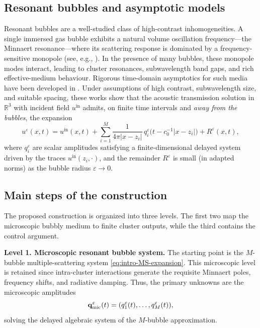 \documentclass[11pt,a4paper]{article}
\numberwithin{equation}{section}
\newcommand{\R}{\mathbb{R}}
\begin{document}
\subsection{Resonant bubbles and asymptotic models}
\noindent
Resonant bubbles are a well-studied class of high-contrast inhomogeneities. A single immersed gas bubble exhibits a natural volume oscillation frequency---the Minnaert resonance---where its scattering response is dominated by a frequency-sensitive monopole (see, e.g., \cite{HDAM-1, HDAM-2, Ammari-1, Ammari-2, CaflischBubbly, LiSiniFabryPerot}). In the presence of many bubbles, these monopole modes interact, leading to cluster resonances, subwavelength band gaps, and rich effective-medium behaviour.
\newline
Rigorous time-domain asymptotics for such media have been developed in \cite{MukherjeeSiniJEE,MukherjeeSiniSIAM}. Under assumptions of high contrast, subwavelength size, and suitable spacing, these works show that the acoustic transmission solution in $\R^3$ with incident field $u^{\mathrm{in}}$ admits, on finite time intervals and \emph{away from the bubbles}, the expansion
\begin{equation}
\label{eq:intro-MS-expansion}
 u^\varepsilon(x,t)
 = u^{\mathrm{in}}(x,t)
   + \sum_{i=1}^M \frac{1}{4\pi|x-z_i|}
     \,q_i^\varepsilon\bigl(t-c_0^{-1}|x-z_i|\bigr)
   + R^\varepsilon(x,t),
\end{equation}
where $q_i^\varepsilon$ are scalar amplitudes satisfying a finite-dimensional delayed system driven by the traces $u^{\mathrm{in}}(z_i,\cdot)$, and the remainder $R^\varepsilon$ is small (in adapted norms) as the bubble radius $\varepsilon\to0$.


\subsection{Main steps of the construction}
\noindent
The proposed construction is organized into three levels. The first two map the microscopic bubbly medium to finite cluster outputs, while the third contains the control argument.

\medskip
\noindent
\textbf{Level 1. Microscopic resonant bubble system.}
The starting point is the $M$-bubble multiple-scattering system \eqref{eq:intro-MS-expansion}. This microscopic level is retained since intra-cluster interactions generate the requisite Minnaert poles, frequency shifts, and radiative damping. Thus, the primary unknowns are the microscopic amplitudes
\[
        \mathbf q_{\rm mic}^\varepsilon(t)
        =(q_1^\varepsilon(t),\ldots,q_M^\varepsilon(t)),
\]
solving the delayed algebraic system of the $M$-bubble approximation.
\end{document}
